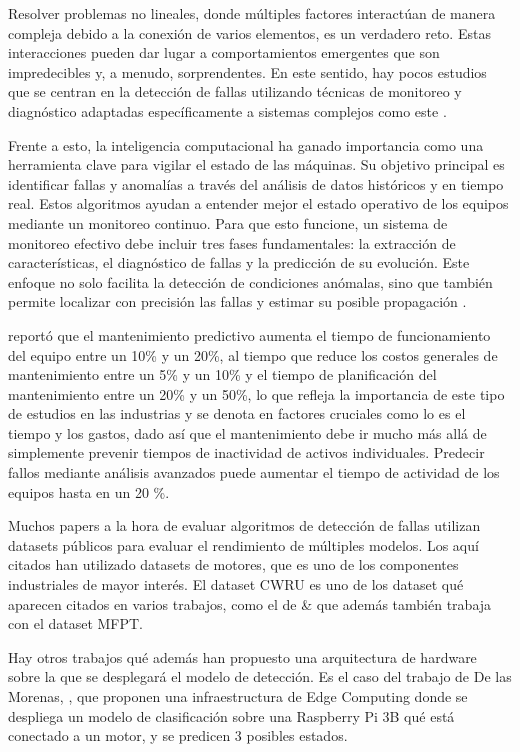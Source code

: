 \documentclass[11pt,a4paper,spanish]{book}
\numberwithin{equation}{chapter}
\numberwithin{figure}{chapter}
\begin{document}
Resolver problemas no lineales, donde múltiples factores interactúan de manera compleja debido a la conexión de varios elementos, es un verdadero reto. Estas interacciones pueden dar lugar a comportamientos emergentes que son impredecibles y, a menudo, sorprendentes. En este sentido, hay pocos estudios que se centran en la detección de fallas utilizando técnicas de monitoreo y diagnóstico adaptadas específicamente a sistemas complejos como este \cite{zhang2017overview}. 


Frente a esto, la inteligencia computacional ha ganado importancia como una herramienta clave para vigilar el estado de las máquinas. Su objetivo principal es identificar fallas y anomalías a través del análisis de datos históricos y en tiempo real. Estos algoritmos ayudan a entender mejor el estado operativo de los equipos mediante un monitoreo continuo. Para que esto funcione, un sistema de monitoreo efectivo debe incluir tres fases fundamentales: la extracción de características, el diagnóstico de fallas y la predicción de su evolución. Este enfoque no solo facilita la detección de condiciones anómalas, sino que también permite localizar con precisión las fallas y estimar su posible propagación \cite{randall2011vibration}.


\cite{deloitte2022predictive} reportó que el mantenimiento predictivo aumenta el tiempo de funcionamiento del equipo entre un 10\% y un 20\%, al tiempo que reduce los costos generales de mantenimiento entre un 5\% y un 10\% y el tiempo de planificación del mantenimiento entre un 20\% y un 50\%, lo que refleja la importancia de este tipo de estudios en las industrias y se denota en factores cruciales como lo es el tiempo y los gastos, dado así que el mantenimiento debe ir mucho más allá de simplemente prevenir tiempos de inactividad de activos individuales. Predecir fallos mediante análisis avanzados puede aumentar el tiempo de actividad de los equipos hasta en un 20 \%.


Muchos papers a la hora de evaluar algoritmos de detección de fallas utilizan datasets públicos para evaluar el rendimiento de múltiples modelos. Los aquí citados han utilizado datasets de motores, que es uno de los componentes industriales de mayor interés. El dataset CWRU es uno de los dataset qué aparecen citados en varios trabajos, como el de \cite{yu2025tkeo} \& \cite{raj2024bearing} que además también trabaja con el dataset MFPT.


Hay otros trabajos qué además han propuesto una arquitectura de hardware sobre la que se desplegará el modelo de detección. Es el caso del trabajo de De las Morenas, \cite{delasmorenas2025bearing}, que proponen una infraestructura de Edge Computing donde se despliega un modelo de clasificación sobre una Raspberry Pi 3B qué está conectado a un motor, y se predicen 3 posibles estados.
\end{document}
